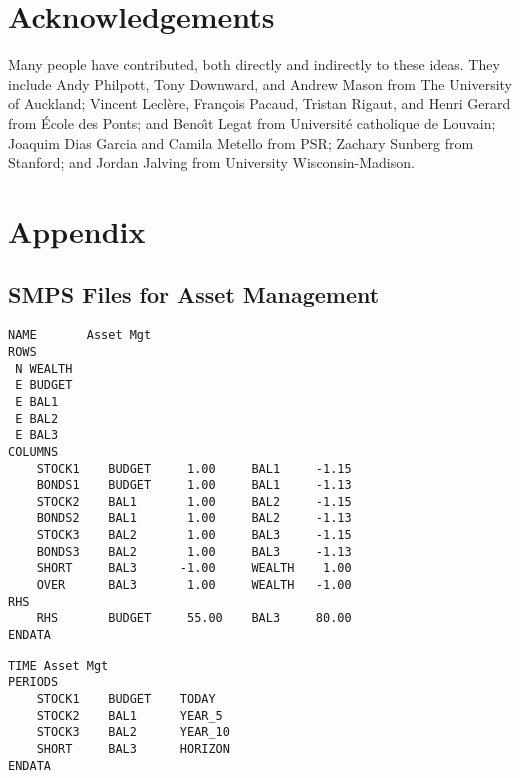 \documentclass[final,1p,times]{elsarticle}
\begin{document}
\section*{Acknowledgements}

Many people have contributed, both directly and indirectly to these ideas. They include Andy Philpott, Tony Downward, and Andrew Mason from The University of Auckland; Vincent Lecl\`ere, Fran{\c c}ois Pacaud, Tristan Rigaut, and Henri Gerard from \'Ecole des Ponts; and Beno\^{\i}t Legat from Universit\'e catholique de Louvain; Joaquim Dias Garcia and Camila Metello from PSR; Zachary Sunberg from Stanford; and Jordan Jalving from University Wisconsin-Madison.




\section*{Appendix}

\subsection*{SMPS Files for Asset Management}

\begin{Verbatim}[frame=single,label=asset\_management.cor]
NAME       Asset Mgt
ROWS
 N WEALTH
 E BUDGET
 E BAL1
 E BAL2
 E BAL3
COLUMNS
    STOCK1    BUDGET     1.00     BAL1     -1.15
    BONDS1    BUDGET     1.00     BAL1     -1.13
    STOCK2    BAL1       1.00     BAL2     -1.15
    BONDS2    BAL1       1.00     BAL2     -1.13
    STOCK3    BAL2       1.00     BAL3     -1.15
    BONDS3    BAL2       1.00     BAL3     -1.13
    SHORT     BAL3      -1.00     WEALTH    1.00
    OVER      BAL3       1.00     WEALTH   -1.00
RHS
    RHS       BUDGET     55.00    BAL3     80.00
ENDATA 
\end{Verbatim}

\begin{Verbatim}[frame=single,label=asset\_management.tim]
TIME Asset Mgt
PERIODS
    STOCK1    BUDGET    TODAY
    STOCK2    BAL1      YEAR_5
    STOCK3    BAL2      YEAR_10
    SHORT     BAL3      HORIZON
ENDATA
\end{Verbatim}
\end{document}
